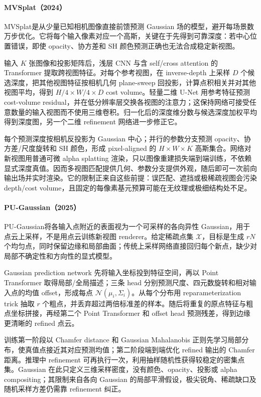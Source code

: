 \paragraph{MVSplat（2024）\cite{2403_14627}}
MVSplat是从少量已知相机图像直接前馈预测 Gaussian 场的模型，避开每场景数万步优化。它将每个输入像素对应一个高斯，关键在于先得到可靠深度：若中心位置错误，即使 opacity、协方差和 SH 颜色预测正确也无法合成稳定新视图。

输入 $K$ 张图像和投影矩阵后，浅层 CNN 与含 self/cross attention 的 Transformer 提取跨视图特征。对每个参考视图，在 inverse-depth 上采样 $D$ 个候选深度，把其他视图特征按相机几何 plane-sweep 回投影，计算点积相关并对其他视图平均，得到 $H/4\times W/4\times D$ cost volume。轻量二维 U-Net 用参考特征预测 cost-volume residual，并在低分辨率层交换各视图的注意力；这保持网络可接受任意数量的输入视图而不使用三维卷积。归一化后的深度维分数与候选深度加权平均得到深度图，另一个二维 refinement 网络进一步修正它。

每个预测深度按相机反投影为 Gaussian 中心；并行的参数分支预测 opacity、协方差/尺度旋转和 SH 颜色，形成 pixel-aligned 的 $H\times W\times K$ 高斯集合。网络对新视图用普通可微 alpha splatting 渲染，只以图像重建损失端到端训练，不依赖显式深度真值。因而多视图匹配提供几何、参数分支提供外观，随后即可一次前向输出场并实时渲染。它的限制正来自这些前提：误匹配、遮挡或极稀疏视图会污染 depth/cost volume，且固定的每像素基元预算可能在无纹理或极细结构处不足。

\paragraph{PU-Gaussian（2025）\cite{2509_20207}}
PU-Gaussian将各输入点附近的表面视为一个可采样的各向异性 Gaussian，用于点云上采样，不是用点云训练新视图 renderer。给定稀疏点集 $\mathcal X$，目标是生成 $rN$ 个均匀点，同时保留边缘和局部曲面；传统上采样网络直接回归每个新点，缺少对局部不确定性和方向性的显式模型。

Gaussian prediction network 先将输入坐标投到特征空间，再以 Point Transformer 取得局部/全局描述；三条 head 分别预测尺度、四元数旋转和相对输入点的均值 offset，形成每点 $\mathcal N(\mu_i,\Sigma_i)$。从每个分布用 reparameterization trick 抽取 $r$ 个粗点，并丢弃超过两倍标准差的样本。随后将重复的原点特征与粗点坐标拼接，再经第二个 Point Transformer 和 offset head 预测残差，得到边缘更清晰的 refined 点云。

训练第一阶段以 Chamfer distance 和 Gaussian Mahalanobis 正则先学习局部分布，使真值点接近其对应预测均值；第二阶段端到端优化 refined 输出的 Chamfer 距离。推理中 refinement 可再执行一次，利用抽样随机性获得较稳定的密集点集。Gaussian 在此只定义三维采样密度，没有颜色、opacity、投影或 alpha compositing；其限制来自各向 Gaussian 的局部平滑假设，极尖锐角、稀疏缺口及随机采样方差仍需靠 refinement 纠正。

